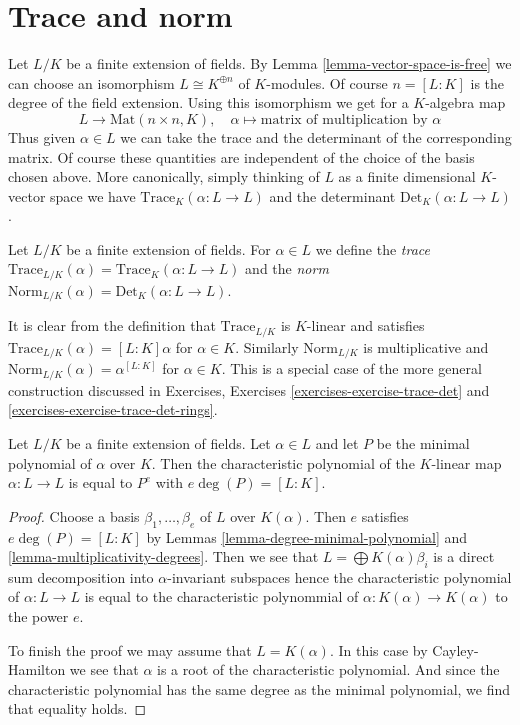 \section{Trace and norm}
\label{section-trace-pairing}

\noindent
Let $L/K$ be a finite extension of fields. By
Lemma \ref{lemma-vector-space-is-free}
we can choose an isomorphism $L \cong K^{\oplus n}$ of $K$-modules.
Of course $n = [L : K]$ is the degree of the field extension.
Using this isomorphism we get for a $K$-algebra map
$$
L \longrightarrow \text{Mat}(n \times n, K),\quad
\alpha \longmapsto \text{matrix of multiplication by }\alpha
$$
Thus given $\alpha \in L$ we can take the trace and the determinant
of the corresponding matrix. Of course these quantities are independent
of the choice of the basis chosen above. More canonically, simply thinking
of $L$ as a finite dimensional $K$-vector space we have
$\text{Trace}_K(\alpha : L \to L)$ and the determinant
$\text{Det}_K(\alpha : L \to L)$.

\begin{definition}
\label{definition-trace-norm}
Let $L/K$ be a finite extension of fields. For $\alpha \in L$ we define
the {\it trace}
$\text{Trace}_{L/K}(\alpha) = \text{Trace}_K(\alpha : L \to L)$
and the {\it norm}
$\text{Norm}_{L/K}(\alpha) = \text{Det}_K(\alpha : L \to L)$.
\end{definition}

\noindent
It is clear from the definition that
$\text{Trace}_{L/K}$ is $K$-linear and satisfies
$\text{Trace}_{L/K}(\alpha) = [L : K]\alpha$ for $\alpha \in K$.
Similarly $\text{Norm}_{L/K}$ is multiplicative and
$\text{Norm}_{L/K}(\alpha) = \alpha^{[L : K]}$ for $\alpha \in K$.
This is a special case of the more general construction discussed
in Exercises, Exercises \ref{exercises-exercise-trace-det} and
\ref{exercises-exercise-trace-det-rings}.

\begin{lemma}
\label{lemma-characteristic-vs-minimal-polynomial}
Let $L/K$ be a finite extension of fields. Let $\alpha \in L$ and let $P$
be the minimal polynomial of $\alpha$ over $K$. Then the characteristic
polynomial of the $K$-linear map $\alpha : L \to L$ is equal to
$P^e$ with $e \deg(P) = [L : K]$.
\end{lemma}

\begin{proof}
Choose a basis $\beta_1, \ldots, \beta_e$ of $L$ over $K(\alpha)$.
Then $e$ satisfies $e \deg(P) = [L : K]$ by
Lemmas \ref{lemma-degree-minimal-polynomial} and
\ref{lemma-multiplicativity-degrees}.
Then we see that $L = \bigoplus K(\alpha) \beta_i$ is a
direct sum decomposition into $\alpha$-invariant subspaces
hence the characteristic polynomial of $\alpha : L \to L$
is equal to the characteristic polynommial of
$\alpha : K(\alpha) \to K(\alpha)$ to the power $e$.

\medskip\noindent
To finish the proof we may assume that $L = K(\alpha)$.
In this case by Cayley-Hamilton we see that $\alpha$
is a root of the characteristic polynomial. And since the
characteristic polynomial has the same degree as the minimal
polynomial, we find that equality holds.
\end{proof}

